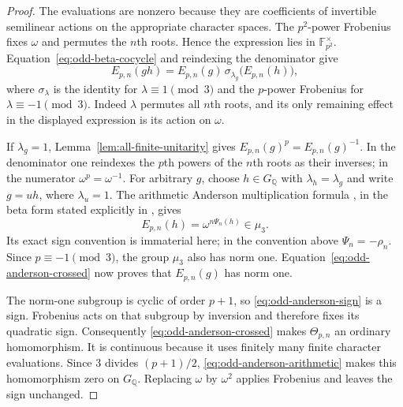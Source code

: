\begin{proof}
The evaluations are nonzero because they are coefficients of
invertible semilinear actions on the appropriate character spaces.
The $p^2$-power Frobenius fixes $\omega$ and permutes the $n$th
roots.  Hence the expression lies in $\mathbb F_{p^2}^\times$.
Equation~\eqref{eq:odd-beta-cocycle} and reindexing the denominator
give
\begin{equation}
 E_{p,n}(gh)=E_{p,n}(g)\,
             \sigma_{\lambda_g}\bigl(E_{p,n}(h)\bigr),
 \label{eq:odd-anderson-crossed}
\end{equation}
where $\sigma_\lambda$ is the identity for $\lambda\equiv1\pmod3$
and the $p$-power Frobenius for $\lambda\equiv-1\pmod3$.
Indeed $\lambda$ permutes all $n$th roots, and its only remaining
effect in the displayed expression is its action on $\omega$.

If $\lambda_g=1$, Lemma~\ref{lem:all-finite-unitarity} gives
$E_{p,n}(g)^p=E_{p,n}(g)^{-1}$.  In the denominator one reindexes
the $p$th powers of the $n$th roots as their inverses; in the numerator
$\omega^p=\omega^{-1}$.  For arbitrary $g$, choose
$h\in G_{\mathbb Q}$ with $\lambda_h=\lambda_g$ and write $g=uh$,
where $\lambda_u=1$.  The arithmetic Anderson multiplication formula
\cite[Corollary~8.6.3]{Anderson1989}, in the beta form stated explicitly
in \cite[Remark~2.4, p.~101]{Furusho2003}, gives
\begin{equation}
 E_{p,n}(h)=\omega^{n\Psi_n(h)}\in\mu_3.
 \label{eq:odd-anderson-arithmetic}
\end{equation}
Its exact sign convention is immaterial here; in the convention above
$\Psi_n=-\rho_n$.  Since $p\equiv-1\pmod3$, the group $\mu_3$ also
has norm one.  Equation~\eqref{eq:odd-anderson-crossed} now proves
that $E_{p,n}(g)$ has norm one.

The norm-one subgroup is cyclic of order $p+1$, so
\eqref{eq:odd-anderson-sign} is a sign.  Frobenius acts on that
subgroup by inversion and therefore fixes its quadratic sign.
Consequently \eqref{eq:odd-anderson-crossed} makes $\Theta_{p,n}$
an ordinary homomorphism.  It is continuous because it uses finitely
many finite character evaluations.  Since $3$ divides $(p+1)/2$,
\eqref{eq:odd-anderson-arithmetic} makes this homomorphism zero on
$G_{\mathbb Q}$.  Replacing $\omega$ by $\omega^2$ applies Frobenius
and leaves the sign unchanged.
\end{proof}

